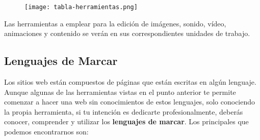 \begin{figure}[H]
    \centering
    \texttt{[image: tabla-herramientas.png]}
\end{figure}

Las herramientas a emplear para la edición de imágenes, sonido, vídeo, animaciones y contenido se verán en sus correspondientes unidades de trabajo.

\subsection{Lenguajes de Marcar}
Los sitios web están compuestos de páginas que están escritas en algún lenguaje. Aunque algunas de las herramientas vistas en el punto anterior te permite comenzar a hacer una web sin conocimientos de estos lenguajes, solo conociendo la propia herramienta, si tu intención es dedicarte profesionalmente, deberás conocer, comprender y utilizar los \textbf{lenguajes de marcar}. Los principales que podemos encontrarnos son:

